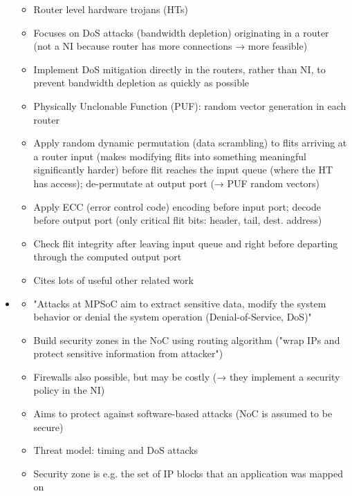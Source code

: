 \documentclass[
	paper=a4,
	fontsize=11pt,
	parskip=full %
]{scrreprt}
\begin{document}
\begin{itemize}
\begin{itemize}
                \item Router level hardware trojans (HTs)
                \item Focuses on DoS attacks (bandwidth depletion) originating in a router (not a NI because router has more connections → more
                    feasible)
                \item Implement DoS mitigation directly in the routers, rather than NI, to prevent bandwidth depletion as quickly as possible
                \item Physically Unclonable Function (PUF): random vector generation in each router
                \item Apply random dynamic permutation (data scrambling) to flits arriving at a router input (makes modifying flits into something
                    meaningful significantly harder) before flit reaches the input queue (where the HT has access); de-permutate at output port (→
                    PUF random vectors)
                \item Apply ECC (error control code) encoding before input port; decode before output port (only critical flit bits: header, tail,
                    dest. address)
                \item Check flit integrity after leaving input queue and right before departing through the computed output port
                \item Cites lots of useful other related work
            \end{itemize}
        \item \textbf{}
            \begin{itemize}
                \item "Attacks at MPSoC aim to extract sensitive data, modify the system behavior or denial the system operation (Denial-of-Service,
                    DoS)"
                \item Build security zones in the NoC using routing algorithm ("wrap IPs and protect sensitive information from attacker")
                \item Firewalls also possible, but may be costly (→ they implement a security policy in the NI)
                \item Aims to protect against software-based attacks (NoC is assumed to be secure)
                \item Threat model: timing and DoS attacks
                \item Security zone is e.g. the set of IP blocks that an application was mapped on

\end{itemize}
\end{itemize}
\end{document}
